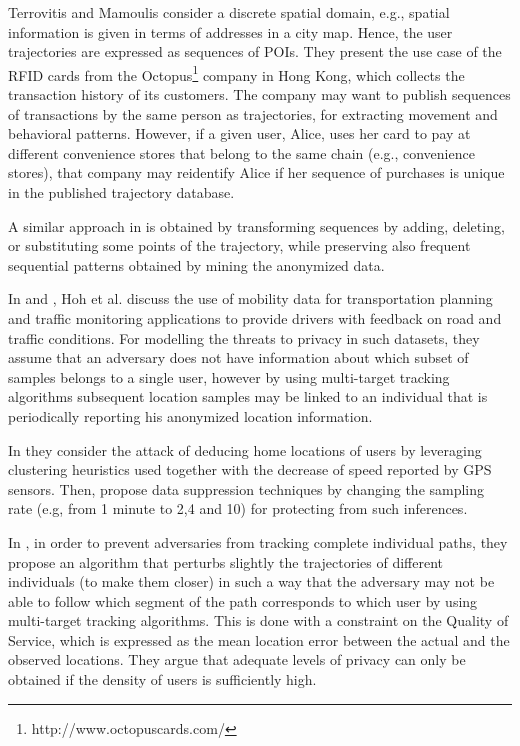 \documentclass{llncs}
\begin{document}
Terrovitis and Mamoulis \cite{Terrovitis:2008} consider a discrete spatial domain, e.g., spatial information is given in terms of addresses in a city map. 
Hence, the user trajectories are expressed as sequences of POIs.
They present the use case of the RFID cards from the Octopus\footnote{http://www.octopuscards.com/} company in Hong Kong, which collects the transaction history of its customers. The company may want to publish sequences of transactions by the same person as trajectories, for extracting movement and behavioral patterns. However, if a given user, Alice, uses her card to pay at different convenience stores that belong to the same chain (e.g., convenience stores), that company may reidentify Alice if her sequence of purchases is unique in the published trajectory database.

  
A similar approach in \cite{Pensa2008} is obtained by transforming sequences by adding, deleting, or substituting some points of the trajectory, while preserving also frequent sequential patterns \cite{Agrawal:1995} obtained by mining the anonymized data.


In \cite{Hoh2005} and \cite{Hoh06}, Hoh et al. discuss the use of mobility data for transportation planning and traffic monitoring applications to provide drivers with feedback on road and traffic conditions. 
For modelling the threats to privacy in such datasets, they assume that an adversary does not have information about which subset of samples belongs to a single user, however by using multi-target tracking algorithms \cite{Reid79analgorithm} subsequent location samples may be linked to an individual that is periodically reporting his anonymized location information. 

In \cite{Hoh06} they consider the attack of deducing home locations of users by leveraging clustering heuristics used together with the decrease of speed reported by GPS sensors. Then, propose data suppression techniques by changing the sampling rate (e.g, from 1 minute to 2,4 and 10) for protecting from such inferences.

In \cite{Hoh2005}, in order to prevent adversaries from tracking complete individual paths, they propose an algorithm that perturbs slightly the trajectories of different individuals (to make them closer) in such a way that the adversary may not be able to follow which segment of the path corresponds to which user by using multi-target tracking algorithms.
This is done with a constraint on the Quality of Service, which is expressed as the mean location error between the actual and the observed locations. They argue that adequate levels of privacy can only be obtained if the density of users is sufficiently high.
\end{document}
